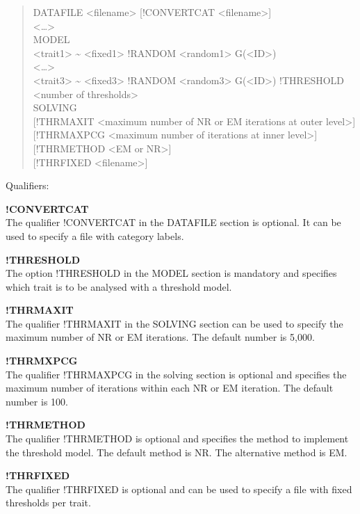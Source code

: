 \begin{quote}
DATAFILE \textless filename\textgreater{} {[}!CONVERTCAT
\textless filename\textgreater{]}\\
\textless\ldots\textgreater{}\\
MODEL\\
\textless trait1\textgreater{} \textasciitilde{}
\textless fixed1\textgreater{} !RANDOM \textless random1\textgreater{}
G(\textless ID\textgreater)\\
\textless\ldots\textgreater{}\\
\textless trait3\textgreater{} \textasciitilde{}
\textless fixed3\textgreater{} !RANDOM \textless random3\textgreater{}
G(\textless ID\textgreater) !THRESHOLD \textless number of
thresholds\textgreater{}\\
SOLVING\\
{[}!THRMAXIT \textless maximum number of NR or EM iterations at outer
level\textgreater{]} {[}!THRMAXPCG \textless maximum number of
iterations at inner level\textgreater{]}\\
{[}!THRMETHOD \textless EM or NR\textgreater{]}\\
{[}!THRFIXED \textless filename\textgreater{]}
\end{quote}

Qualifiers:

\textbf{!CONVERTCAT}\\
The qualifier !CONVERTCAT in the DATAFILE section is optional. It can be
used to specify a file with category labels.

\textbf{!THRESHOLD}\\
The option !THRESHOLD in the MODEL section is mandatory and specifies
which trait is to be analysed with a threshold model.

\textbf{!THRMAXIT}\\
The qualifier !THRMAXIT in the SOLVING section can be used to specify
the maximum number of NR or EM iterations. The default number is 5,000.

\textbf{!THRMXPCG}\\
The qualifier !THRMAXPCG in the solving section is optional and
specifies the maximum number of iterations within each NR or EM
iteration. The default number is 100.

\textbf{!THRMETHOD}\\
The qualifier !THRMETHOD is optional and specifies the method to
implement the threshold model. The default method is NR. The alternative
method is EM.

\textbf{!THRFIXED}\\
The qualifier !THRFIXED is optional and can be used to specify a file
with fixed thresholds per trait.

